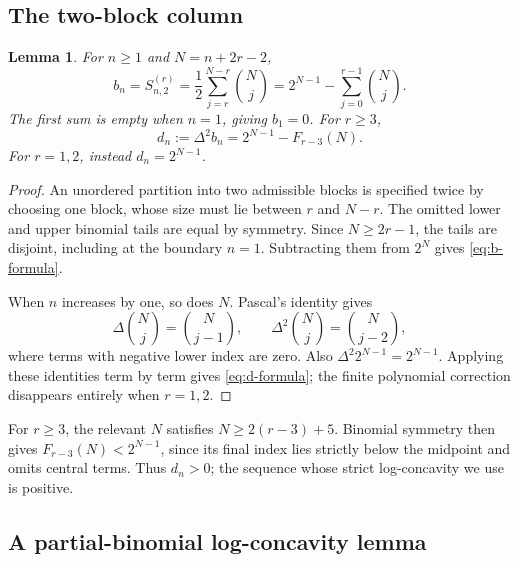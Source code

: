 \documentclass[11pt,a4paper]{article}
\newtheorem{lemma}[theorem]{Lemma}
\theoremstyle{definition}
\numberwithin{equation}{section}
\begin{document}
\subsection{The two-block column}

\begin{lemma}
\label{lem:two-blocks}
For $n\ge1$ and $N=n+2r-2$,
\begin{equation}
 b_n=S^{(r)}_{n,2}
 =\frac12\sum_{j=r}^{N-r}\binom Nj
 =2^{N-1}-\sum_{j=0}^{r-1}\binom Nj.
 \label{eq:b-formula}
\end{equation}
The first sum is empty when $n=1$, giving $b_1=0$.
For $r\ge3$,
\begin{equation}
 d_n:=\Delta^2b_n=2^{N-1}-F_{r-3}(N).
 \label{eq:d-formula}
\end{equation}
For $r=1,2$, instead $d_n=2^{N-1}$.
\end{lemma}
\begin{proof}
An unordered partition into two admissible blocks is specified twice by
choosing one block, whose size must lie between $r$ and $N-r$.
The omitted lower and upper binomial tails are equal by symmetry. Since
$N\ge2r-1$, the tails are disjoint, including at the boundary $n=1$.
Subtracting them from $2^N$ gives \eqref{eq:b-formula}.

When $n$ increases by one, so does $N$. Pascal's identity gives
\[
 \Delta\binom Nj=\binom N{j-1},\qquad
 \Delta^2\binom Nj=\binom N{j-2},
\]
where terms with negative lower index are zero. Also
$\Delta^2 2^{N-1}=2^{N-1}$. Applying these identities term by term gives
\eqref{eq:d-formula}; the finite polynomial correction disappears
entirely when $r=1,2$.
\end{proof}

For $r\ge3$, the relevant $N$ satisfies $N\ge2(r-3)+5$.
Binomial symmetry then gives $F_{r-3}(N)<2^{N-1}$, since its final
index lies strictly below the midpoint and omits central terms. Thus
$d_n>0$; the sequence whose strict log-concavity we use is positive.

\subsection{A partial-binomial log-concavity lemma}
\end{document}
